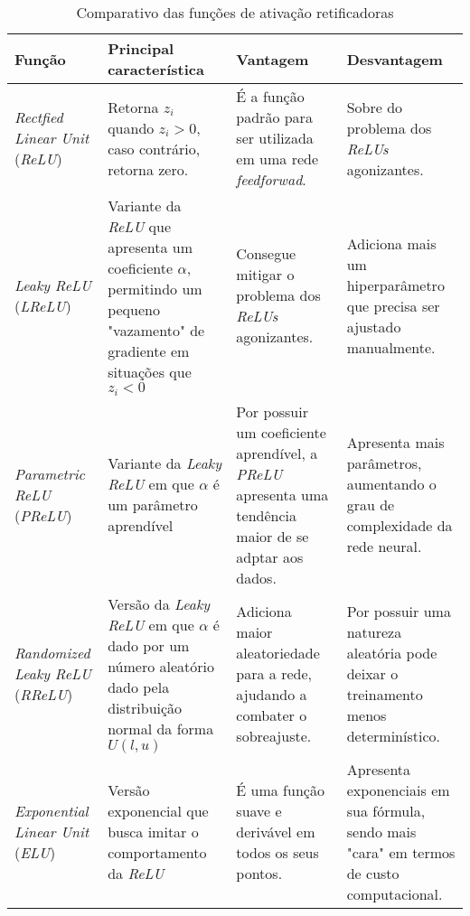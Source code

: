 \begin{table}[htbp]
    \centering
    \begin{threeparttable}
        \caption{Comparativo das funções de ativação retificadoras}
        \label{tab:comparativo-funcoes-retificadoras}
        \begin{tabularx}{\textwidth}{p{3.2cm} *{3}{>{\raggedright\arraybackslash}X}}
            \toprule
            \textbf{Função} & \textbf{Principal característica} &\textbf{Vantagem} & \textbf{Desvantagem} \\
            \midrule
            \textit{Rectfied Linear Unit} (\textit{ReLU}) & Retorna $z_i$ quando $z_i > 0$, caso contrário, retorna zero. & É a função padrão para ser utilizada em uma rede \textit{feedforwad}. & Sobre do problema dos \textit{ReLUs} agonizantes. \\
            \addlinespace
            \textit{Leaky ReLU} (\textit{LReLU}) & Variante da \textit{ReLU} que apresenta um coeficiente $\alpha$, permitindo um pequeno "vazamento" de gradiente em situações que $z_i < 0$ & Consegue mitigar o problema dos \textit{ReLUs} agonizantes. & Adiciona mais um hiperparâmetro que precisa ser ajustado manualmente. \\
            \addlinespace
            \textit{Parametric ReLU} (\textit{PReLU}) & Variante da \textit{Leaky ReLU} em que $\alpha$ é um parâmetro aprendível & Por possuir um coeficiente aprendível, a \textit{PReLU} apresenta uma tendência maior de se adptar aos dados. & Apresenta mais parâmetros, aumentando o grau de complexidade da rede neural. \\
            \addlinespace
            \textit{Randomized Leaky ReLU} (\textit{RReLU}) & Versão da \textit{Leaky ReLU} em que $\alpha$ é dado por um número aleatório dado pela distribuição normal da forma $U(l, u)$ & Adiciona maior aleatoriedade para a rede, ajudando a combater o sobreajuste. & Por possuir uma natureza aleatória pode deixar o treinamento menos determinístico.  \\
            \addlinespace
            \textit{Exponential Linear Unit} (\textit{ELU}) & Versão exponencial que busca imitar o comportamento da \textit{ReLU} & É uma função suave e derivável em todos os seus pontos. & Apresenta exponenciais em sua fórmula, sendo mais "cara" em termos de custo computacional. \\

\end{tabularx}
\end{threeparttable}
\end{table}
